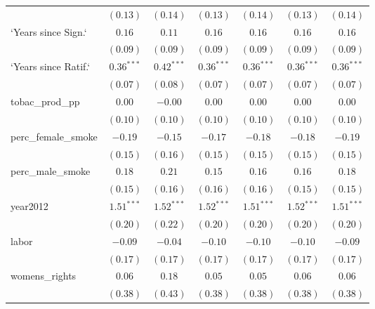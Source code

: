 \begin{table}[!h]
\begin{center}
\begin{tabular}{l c c c c c c }
                        & $(0.13)$     & $(0.14)$     & $(0.13)$     & $(0.14)$     & $(0.13)$     & $(0.14)$     \\
`Years since Sign.`     & $0.16$       & $0.11$       & $0.16$       & $0.16$       & $0.16$       & $0.16$       \\
                        & $(0.09)$     & $(0.09)$     & $(0.09)$     & $(0.09)$     & $(0.09)$     & $(0.09)$     \\
`Years since Ratif.`    & $0.36^{***}$ & $0.42^{***}$ & $0.36^{***}$ & $0.36^{***}$ & $0.36^{***}$ & $0.36^{***}$ \\
                        & $(0.07)$     & $(0.08)$     & $(0.07)$     & $(0.07)$     & $(0.07)$     & $(0.07)$     \\
tobac\_prod\_pp         & $0.00$       & $-0.00$      & $0.00$       & $0.00$       & $0.00$       & $0.00$       \\
                        & $(0.10)$     & $(0.10)$     & $(0.10)$     & $(0.10)$     & $(0.10)$     & $(0.10)$     \\
perc\_female\_smoke     & $-0.19$      & $-0.15$      & $-0.17$      & $-0.18$      & $-0.18$      & $-0.19$      \\
                        & $(0.15)$     & $(0.16)$     & $(0.15)$     & $(0.15)$     & $(0.15)$     & $(0.15)$     \\
perc\_male\_smoke       & $0.18$       & $0.21$       & $0.15$       & $0.16$       & $0.16$       & $0.18$       \\
                        & $(0.15)$     & $(0.16)$     & $(0.16)$     & $(0.16)$     & $(0.15)$     & $(0.15)$     \\
year2012                & $1.51^{***}$ & $1.52^{***}$ & $1.52^{***}$ & $1.51^{***}$ & $1.52^{***}$ & $1.51^{***}$ \\
                        & $(0.20)$     & $(0.22)$     & $(0.20)$     & $(0.20)$     & $(0.20)$     & $(0.20)$     \\
labor                   & $-0.09$      & $-0.04$      & $-0.10$      & $-0.10$      & $-0.10$      & $-0.09$      \\
                        & $(0.17)$     & $(0.17)$     & $(0.17)$     & $(0.17)$     & $(0.17)$     & $(0.17)$     \\
womens\_rights          & $0.06$       & $0.18$       & $0.05$       & $0.05$       & $0.06$       & $0.06$       \\
                        & $(0.38)$     & $(0.43)$     & $(0.38)$     & $(0.38)$     & $(0.38)$     & $(0.38)$     \\

\end{tabular}
\end{center}
\end{table}
